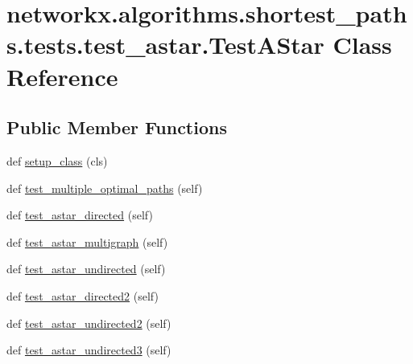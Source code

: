 \hypertarget{classnetworkx_1_1algorithms_1_1shortest__paths_1_1tests_1_1test__astar_1_1TestAStar}{}\section{networkx.\+algorithms.\+shortest\+\_\+paths.\+tests.\+test\+\_\+astar.\+Test\+A\+Star Class Reference}
\label{classnetworkx_1_1algorithms_1_1shortest__paths_1_1tests_1_1test__astar_1_1TestAStar}
\subsection*{Public Member Functions}
\begin{DoxyCompactItemize}
\item 
def \hyperlink{classnetworkx_1_1algorithms_1_1shortest__paths_1_1tests_1_1test__astar_1_1TestAStar_ae5406f2dd304b6c6ea78fec05f29e407}{setup\+\_\+class} (cls)
\item 
def \hyperlink{classnetworkx_1_1algorithms_1_1shortest__paths_1_1tests_1_1test__astar_1_1TestAStar_a961644d53d2abe80effb8c168fcf7a1d}{test\+\_\+multiple\+\_\+optimal\+\_\+paths} (self)
\item 
def \hyperlink{classnetworkx_1_1algorithms_1_1shortest__paths_1_1tests_1_1test__astar_1_1TestAStar_a83405c4c70b72f0ab1b6477c2a5867b5}{test\+\_\+astar\+\_\+directed} (self)
\item 
def \hyperlink{classnetworkx_1_1algorithms_1_1shortest__paths_1_1tests_1_1test__astar_1_1TestAStar_a13abe30c8e0b95aa869ae2fed4c90909}{test\+\_\+astar\+\_\+multigraph} (self)
\item 
def \hyperlink{classnetworkx_1_1algorithms_1_1shortest__paths_1_1tests_1_1test__astar_1_1TestAStar_afcac46aee2046e68c594b7fa90a4124c}{test\+\_\+astar\+\_\+undirected} (self)
\item 
def \hyperlink{classnetworkx_1_1algorithms_1_1shortest__paths_1_1tests_1_1test__astar_1_1TestAStar_ae2e788478d2b137ba5e1df7f9dce231e}{test\+\_\+astar\+\_\+directed2} (self)
\item 
def \hyperlink{classnetworkx_1_1algorithms_1_1shortest__paths_1_1tests_1_1test__astar_1_1TestAStar_aeebd008228c1f3aa72c2fb368a619fd1}{test\+\_\+astar\+\_\+undirected2} (self)
\item 
def \hyperlink{classnetworkx_1_1algorithms_1_1shortest__paths_1_1tests_1_1test__astar_1_1TestAStar_a5672e5f0294bb72e47cc4ff2cfe34811}{test\+\_\+astar\+\_\+undirected3} (self)

\end{DoxyCompactItemize}
